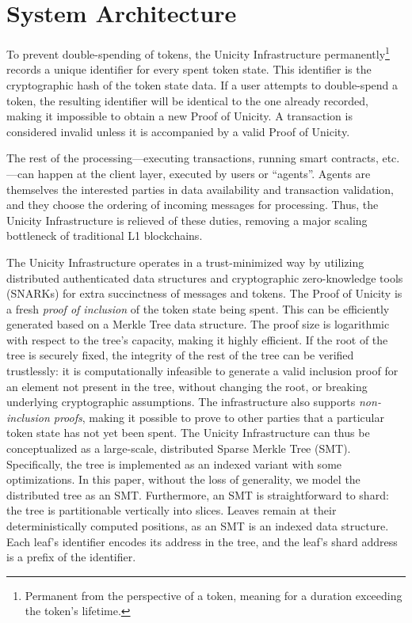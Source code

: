 \documentclass[twocolumn]{article}
\begin{document}


\section{System Architecture}

To prevent double-spending of tokens, the Unicity Infrastructure permanently\footnote{Permanent from the perspective of a token, meaning for a duration exceeding the token's lifetime.} records a unique identifier for every spent token state. This identifier is the cryptographic hash of the token state data. If a user attempts to double-spend a token, the resulting identifier will be identical to the one already recorded, making it impossible to obtain a new Proof of Unicity. A transaction is considered invalid unless it is accompanied by a valid Proof of Unicity.

The rest of the processing---executing transactions, running smart contracts, etc.---can happen at the client layer, executed by users or ``agents''. Agents are themselves the interested parties in data availability and transaction validation, and they choose the ordering of incoming messages for processing. Thus, the Unicity Infrastructure is relieved of these duties, removing a major scaling bottleneck of traditional L1 blockchains.

The Unicity Infrastructure operates in a trust-minimized way by utilizing distributed authenticated data structures and cryptographic zero-knowledge tools (SNARKs) for extra succinctness of messages and tokens. The Proof of Unicity is a fresh \emph{proof of inclusion} of the token state being spent. This can be efficiently generated based on a Merkle Tree data structure. The proof size is logarithmic with respect to the tree's capacity, making it highly efficient. If the root of the tree is securely fixed, the integrity of the rest of the tree can be verified trustlessly: it is computationally infeasible to generate a valid inclusion proof for an element not present in the tree, without changing the root, or breaking underlying cryptographic assumptions. The infrastructure also supports \textit{non-inclusion proofs}, making it possible to prove to other parties that a particular token state has not yet been spent. The Unicity Infrastructure can thus be conceptualized as a large-scale, distributed Sparse Merkle Tree (SMT). Specifically, the tree is implemented as an indexed variant with some optimizations. In this paper, without the loss of generality, we model the distributed tree as an SMT. Furthermore, an SMT is straightforward to shard: the tree is partitionable vertically into slices. Leaves remain at their deterministically computed positions, as an SMT is an indexed data structure. Each leaf's identifier encodes its address in the tree, and the leaf's shard address is a prefix of the identifier.
\end{document}
